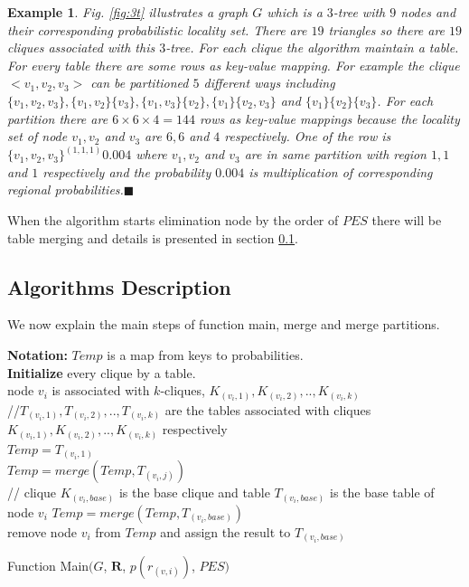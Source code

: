 \documentclass[11pt]{article}
\newtheorem{exmp}{Example}[section]
\begin{document}
\begin{exmp}
\normalfont
Fig. \ref{fig:3t} illustrates a graph $G$ which is a $3$-tree with $9$ nodes and their corresponding probabilistic locality set. There are $19$ triangles so there are $19$ cliques associated with this $3$-tree. For each clique the algorithm maintain a table. For every table there are some rows as key-value mapping. For example the clique $<v_1,v_2,v_3>$  can be partitioned $5$ different ways including $\{v_1,v_2,v_3\}, \{v_1,v_2\}\{v_3\}, \{v_1,v_3\}\{v_2\},\{v_1\}\{v_2,v_3\}$ and $\{v_1\}\{v_2\}\{v_3\} $. For each partition there are  $6\times6\times4=144$ rows as key-value mappings because the locality set of node $v_1,v_2$ and $v_3$ are $6,6$ and $4$ respectively. One of the row is ${\{v_1,v_2,v_3\}}^{(1,1,1)} 0.004$ where $v_1,v_2$ and $v_3$ are in same partition with region $1, 1$ and $1$ respectively and the probability $0.004$ is multiplication of corresponding regional probabilities.$\blacksquare$
\end{exmp}
When the algorithm starts elimination node by the order of $PES$ there will be table merging and details is presented in section \ref{sub:Ald}.
\subsection{Algorithms Description}
\label{sub:Ald}
We now explain the main steps of function main, merge and merge partitions.
\begin{algorithm} [h]
\Indm
{}
\textbf {Notation:} $Temp$ is a map from keys to probabilities.\\
\Indp
\nl \textbf{Initialize } every clique by  a table.\\
\nl{}
{
 \nl node $v_i$ is associated with $k$-cliques, $K_{(v_i,1)},K_{(v_i,2)},..,K_{(v_i,k)}$ \\
 //$T_{(v_i,1)},T_{(v_i,2)},..,T_{(v_i,k)}$ are the tables associated with cliques $K_{(v_i,1)},K_{(v_i,2)},..,K_{(v_i,k)}$ respectively \\
\nl $ Temp=T_{(v_i,1)}$  \\
 \nl {}
 {
  \nl $Temp=merge(Temp,T_{(v_i,j)})$\\
 }
 // clique $K_{(v_i,base)}$ is the base clique and table $T_{(v_i,base)}$ is the base table of node $v_i$
  \nl $Temp=merge(Temp,T_{(v_i,base)})$\\
\nl  remove node $v_i$ from $Temp$ and assign the result to $T_{(v_i,base)}$
}

\nl {}
\caption{Function Main$(G$, $\textbf{R}$, $p(r_{(v,i)})$, $PES )$}
\end{algorithm}
\end{document}
